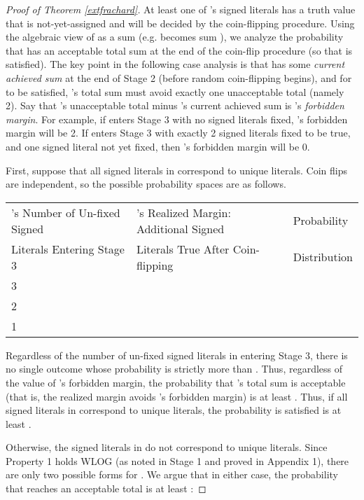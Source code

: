 \documentclass{article}
\begin{document}
\begin{proof}[Proof of Theorem \ref{extfrachard}]
At least one of 's signed literals has a truth value that is not-yet-assigned and will be decided by the coin-flipping procedure. Using the algebraic view of  as a sum (e.g. becomes sum ), we
analyze the probability that  has an acceptable total sum at the end of the coin-flip procedure (so that  is satisfied). The key point in the following case analysis is that  has some \textit{current achieved sum} at the end of Stage 2 (before random coin-flipping begins), and for  to be satisfied, 's total sum must avoid exactly one unacceptable total (namely 2). Say that 's unacceptable total minus 's current achieved sum is 's \textit{forbidden margin}. For example, if  enters Stage 3 with no signed literals fixed, 's forbidden margin will be 2. If  enters Stage 3 with exactly 2 signed literals fixed to be true, and one signed literal not yet fixed, then 's forbidden margin will be 0.  

First, suppose that all signed literals in  correspond to unique literals. Coin flips are independent, so the possible probability spaces are as follows.

\renewcommand\arraystretch{1.2} 

\begin{tabular}{|l|l|l|} \hline
's Number of Un-fixed Signed  & 's Realized Margin: Additional Signed  & Probability  \\
Literals Entering Stage 3 & Literals True After Coin-flipping& Distribution  \\
\hline
3 & & \\ 
\hline
2 & & \\ 
\hline
1 & & \\ 
\hline
\end{tabular}

\vspace{2mm}

Regardless of the number of un-fixed signed literals in  entering Stage 3, there is no single outcome whose probability is strictly more than .  Thus, regardless of the value of 's forbidden margin, the probability that 's total sum is acceptable (that is, the realized margin avoids 's forbidden margin) is at least . Thus, if all signed literals in  correspond to unique literals, the probability  is satisfied is at least .



Otherwise, the signed literals in  do not correspond to unique literals. Since  Property 1 holds WLOG (as noted in Stage 1 and proved in Appendix 1), there are only two possible forms for . We argue that in either case, the probability that  reaches an acceptable total is at least :


\end{proof}
\end{document}
